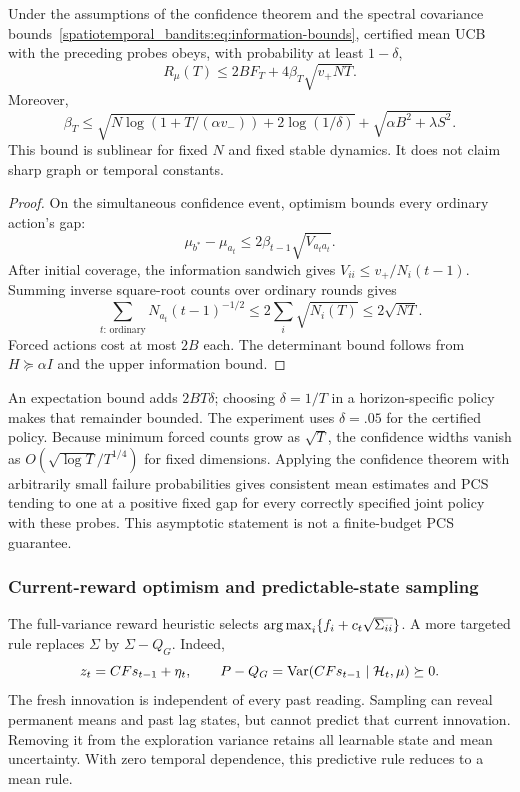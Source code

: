 \begin{theorem}
Under the assumptions of the confidence theorem and the spectral covariance bounds~\eqref{spatiotemporal_bandits:eq:information-bounds}, certified mean UCB with the preceding probes obeys, with probability at least $1-\delta$,
\begin{equation}
\boxed{R_\mu(T)\le 2BF_T+4\beta_T\sqrt{v_+NT}.}
\label{spatiotemporal_bandits:eq:mean-regret-bound}
\end{equation}
Moreover,
\[
\beta_T\le\sqrt{N\log(1+T/(\alpha v_-))+2\log(1/\delta)}
+\sqrt{\alpha B^2+\lambda S^2}.
\]
This bound is sublinear for fixed $N$ and fixed stable dynamics. It does not claim sharp graph or temporal constants.
\end{theorem}
\begin{proof}
On the simultaneous confidence event, optimism bounds every ordinary action's gap:
\[
\mu_{b^*}-\mu_{a_t}\le2\beta_{t-1}\sqrt{V_{a_ta_t}}.
\]
After initial coverage, the information sandwich gives $V_{ii}\le v_+/N_i(t-1)$. Summing inverse square-root counts over ordinary rounds gives
\[
\sum_{t:\,\text{ordinary}}N_{a_t}(t-1)^{-1/2}
\le2\sum_i\sqrt{N_i(T)}\le2\sqrt{NT}.
\]
Forced actions cost at most $2B$ each. The determinant bound follows from $H\succeq\alpha I$ and the upper information bound.
\end{proof}
An expectation bound adds $2BT\delta$; choosing $\delta=1/T$ in a horizon-specific policy makes that remainder bounded. The experiment uses $\delta=.05$ for the certified policy. Because minimum forced counts grow as $\sqrt T$, the confidence widths vanish as $O(\sqrt{\log T}/T^{1/4})$ for fixed dimensions. Applying the confidence theorem with arbitrarily small failure probabilities gives consistent mean estimates and PCS tending to one at a positive fixed gap for every correctly specified joint policy with these probes. This asymptotic statement is not a finite-budget PCS guarantee.



\subsubsection{Current-reward optimism and predictable-state sampling}
The full-variance reward heuristic selects $\operatorname*{arg\,max}_i\{f_i+c_t\sqrt{\Sigma_{ii}}\}$. A more targeted rule replaces $\Sigma$ by $\Sigma-Q_G$. Indeed,
\[
z_t=CFs_{t-1}+\eta_t,\qquad
P-Q_G=\operatorname{Var}(CFs_{t-1}\mid\mathcal H_t,\mu)\succeq0.
\]
The fresh innovation is independent of every past reading. Sampling can reveal permanent means and past lag states, but cannot predict that current innovation. Removing it from the exploration variance retains all learnable state and mean uncertainty. With zero temporal dependence, this predictive rule reduces to a mean rule.

